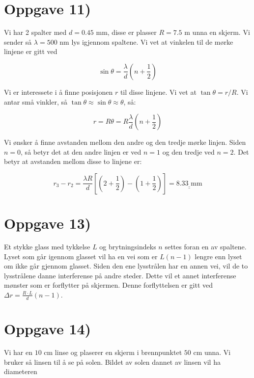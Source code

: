 \documentclass[a4paper,norsk, 10pt]{article}
\begin{document}
\section*{Oppgave 11)}
Vi har 2 spalter med $d = 0.45$ mm, disse er plasser $ R = 7.5$ m unna en skjerm. Vi sender så  $\lambda = 500$ nm lys igjennom spaltene. Vi vet at vinkelen til de mørke linjene er gitt ved

\begin{equation}
\sin \theta = \frac{\lambda}{d}(n + \frac{1}{2})
\label{eq:morkeLinjer}
\end{equation}

Vi er interessete i å finne posisjonen $r$ til disse linjene. Vi vet at $\tan \theta = r/R$. Vi antar små vinkler, så $\tan \theta \approx \sin \theta \approx \theta$, så:

\begin{equation}
r = R\theta = R \frac{\lambda}{d}(n + \frac{1}{2})
\end{equation}

Vi ønsker å finne avstanden mellom den andre og den tredje mørke linjen. Siden $n = 0$, så betyr det at den andre linjen er ved $n = 1$ og den tredje ved $n = 2$. Det betyr at avstanden mellom disse to linjene er:

\begin{equation}
r_3 - r_2 = \frac{\lambda R}{d}\left[(2 + \frac{1}{2}) - (1 + \frac{1}{2})\right] = \underline{\underline{8.33 \text{ mm}}}
\end{equation}


\section*{Oppgave 13)}
Et stykke glass med tykkelse $L$ og brytningsindeks $n$ settes foran en av spaltene. Lyset som går igennom glasset vil ha en vei som er $L(n-1)$ lengre enn lyset om ikke går gjennom glasset. Siden den ene lysstrålen har en annen vei, vil de to lysstrålene danne interferense på andre steder. Dette vil et annet interferense mønster som er forflytter på skjermen. Denne forflyttelsen er gitt ved $\Delta r = \frac{R\cdot L}{d}(n - 1)$.


\section*{Oppgave 14)}

Vi har en $10$ cm linse og plaserer en skjerm i brennpunktet $50$ cm unna. Vi bruker så linsen til å se på solen. Bildet av solen dannet av linsen vil ha diameteren
\end{document}

